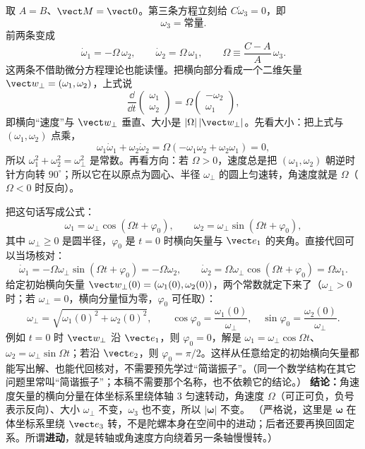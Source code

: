 \documentclass[11pt]{ctexart}
\let\origsubhdr\subhdr
\renewcommand{\subhdr}[1]{\par\needspace{3\baselineskip}\origsubhdr{#1}}
\begin{document}

取 $A=B$、$\vect M=\vect0$。第三条方程立刻给 $C\dot\omega_3=0$，即
\[
\omega_3=\text{常量}.
\]
前两条变成
\[
\dot\omega_1=-\Omega\,\omega_2,\qquad \dot\omega_2=\Omega\,\omega_1,
\qquad
\Omega\equiv\frac{C-A}{A}\,\omega_3 .
\]
这两条不借助微分方程理论也能读懂。把横向部分看成一个二维矢量 $\vect w_\perp=(\omega_1,\omega_2)$，上式说
\[
\frac{\dd}{\dd t}\begin{pmatrix}\omega_1\\\omega_2\end{pmatrix}
=\Omega\begin{pmatrix}-\omega_2\\\omega_1\end{pmatrix},
\]
即横向“速度”与 $\vect w_\perp$ 垂直、大小是 $|\Omega|\,|\vect w_\perp|$。先看大小：把上式与 $(\omega_1,\omega_2)$ 点乘，
\[
\omega_1\dot\omega_1+\omega_2\dot\omega_2
=\Omega(-\omega_1\omega_2+\omega_2\omega_1)=0,
\]
所以 $\omega_1^2+\omega_2^2=\omega_\perp^2$ 是常数。再看方向：若 $\Omega>0$，速度总是把 $(\omega_1,\omega_2)$ 朝逆时针方向转 $90^\circ$；所以它在以原点为圆心、半径 $\omega_\perp$ 的圆上匀速转，角速度就是 $\Omega$（$\Omega<0$ 时反向）。

把这句话写成公式：
\[
\omega_1=\omega_\perp\cos(\Omega t+\varphi_0),\qquad
\omega_2=\omega_\perp\sin(\Omega t+\varphi_0),
\]
其中 $\omega_\perp\ge0$ 是圆半径，$\varphi_0$ 是 $t=0$ 时横向矢量与 $\vect e_1$ 的夹角。直接代回可以当场核对：
\[
\dot\omega_1=-\Omega\omega_\perp\sin(\Omega t+\varphi_0)=-\Omega\omega_2,
\qquad
\dot\omega_2=\Omega\omega_\perp\cos(\Omega t+\varphi_0)=\Omega\omega_1 .
\]
给定初始横向矢量 $\vect w_\perp(0)=(\omega_1(0),\omega_2(0))$，两个常数就定下来了（$\omega_\perp>0$ 时；若 $\omega_\perp=0$，横向分量恒为零，$\varphi_0$ 可任取）：
\[
\omega_\perp=\sqrt{\omega_1(0)^2+\omega_2(0)^2},
\qquad
\cos\varphi_0=\frac{\omega_1(0)}{\omega_\perp},\quad
\sin\varphi_0=\frac{\omega_2(0)}{\omega_\perp}.
\]
例如 $t=0$ 时 $\vect w_\perp$ 沿 $\vect e_1$，则 $\varphi_0=0$，解是 $\omega_1=\omega_\perp\cos\Omega t$、$\omega_2=\omega_\perp\sin\Omega t$；若沿 $\vect e_2$，则 $\varphi_0=\pi/2$。这样从任意给定的初始横向矢量都能写出解、也能代回核对，不需要预先学过“简谐振子”。（同一个数学结构在其它问题里常叫“简谐振子”；本稿不需要那个名称，也不依赖它的结论。）
\textbf{结论：}角速度矢量的横向分量在体坐标系里绕体轴 $3$ 匀速转动，角速度 $\Omega$（可正可负，负号表示反向）、大小 $\omega_\perp$ 不变，$\omega_3$ 也不变，所以 $|\boldsymbol\omega|$ 不变。
（严格说，这里是 $\boldsymbol\omega$ 在体坐标系里绕 $\vect e_3$ 转，不是陀螺本身在空间中的进动；后者还要再换回固定系。所谓\textbf{进动}，就是转轴或角速度方向绕着另一条轴慢慢转。）
\end{document}
